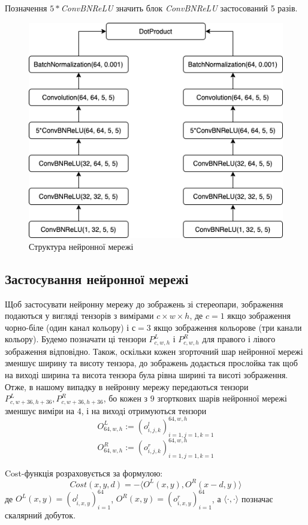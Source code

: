\documentclass[11pt]{article}
\theoremstyle{definition}
\begin{document}
Позначення $5*$\textit{ConvBNReLU} значить блок \textit{ConvBNReLU} застосований 5 разів.
	
\begin{figure}[h]
	\includegraphics[width=\linewidth]{nn_structure_prod}
	\centering
	\caption{Структура нейронної мережі}
	\label{fig:nn_structure}
\end{figure}

\subsection{Застосування нейронної мережі}
Щоб застосувати нейронну мережу до зображень зі стереопари, зображення подаються у вигляді тензорів з вимірами $c \times w \times h$, де $c=1$ якщо зображення чорно-біле (один канал кольору) і $с=3$ якщо зображення кольорове (три канали кольору). Будемо позначати ці тензори $P^L_{c, w, h}$ і $P^R_{c, w, h}$ для правого і лівого зображення відповідно. Також, оскільки кожен згорточний шар нейронної мережі зменшує ширину та висоту тензора, до зображень додається прослойка так щоб на виході ширина та висота тензора була рівна ширині та висоті зображення. Отже, в нашому випадку в нейронну мережу передаються тензори $P^L_{c, w+36, h+36}, P^R_{c, w+36, h+36}$, бо кожен з $9$ згорткових шарів нейронної мережі зменшує виміри на $4$, і на виході отримуються тензори
\[ O^L_{64, w, h} := (o^l_{i,j,k})_{i=1,j=1,k=1}^{64,w,h} \]
\[ O^R_{64, w, h} := (o^r_{i,j,k})_{i=1,j=1,k=1}^{64,w,h} \]

Cost-функція розраховується за формулою:
\[ Cost(x, y, d) = - \langle O^L(x, y), O^R(x - d, y) \rangle \]
де $O^L(x, y) = (o^l_{i,x,y})_{i=1}^{64}$, $O^R(x, y) = (o^r_{i,x,y})_{i=1}^{64}$, а $\langle \cdot, \cdot \rangle$ позначає скалярний добуток.
\end{document}
